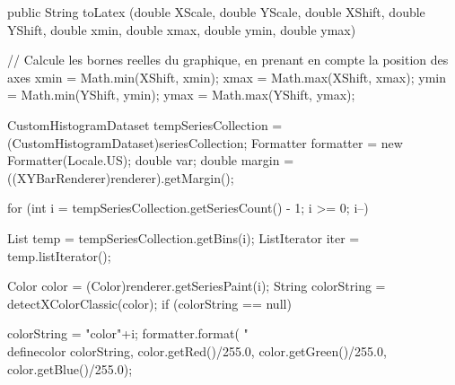 \begin{code}

   public String toLatex (double XScale, double YScale, double XShift,
                          double YShift, double xmin, double xmax,
                          double ymin, double ymax) \begin{hide} {

      // Calcule les bornes reelles du graphique, en prenant en compte la position des axes
      xmin = Math.min(XShift, xmin);
      xmax = Math.max(XShift, xmax);
      ymin = Math.min(YShift, ymin);
      ymax = Math.max(YShift, ymax);

      CustomHistogramDataset tempSeriesCollection = (CustomHistogramDataset)seriesCollection;
      Formatter formatter = new Formatter(Locale.US);
      double var;
      double margin = ((XYBarRenderer)renderer).getMargin();

      for (int i = tempSeriesCollection.getSeriesCount() - 1; i >= 0; i--) {
         List temp = tempSeriesCollection.getBins(i);
         ListIterator iter = temp.listIterator();

         Color color = (Color)renderer.getSeriesPaint(i);
         String colorString = detectXColorClassic(color);
         if (colorString == null) {
            colorString = "color"+i;
            formatter.format( "\\definecolor{%
                              colorString, color.getRed()/255.0, color.getGreen()/255.0,
                              color.getBlue()/255.0);
         }

}}}
\end{hide}
\end{code}
